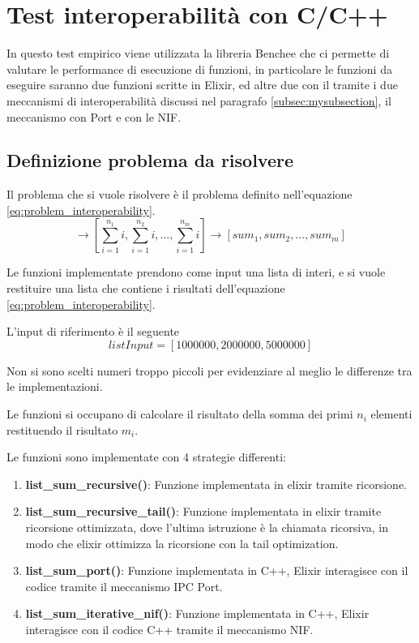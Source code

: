 \newpage

\section{Test interoperabilità con C/C++}

In questo test empirico viene utilizzata la libreria Benchee
che ci permette di valutare le performance di esecuzione di
funzioni, in particolare le funzioni da eseguire saranno due funzioni
scritte in Elixir, ed altre due con il tramite i due meccanismi di
interoperabilità discussi nel paragrafo \ref{subsec:mysubsection},
il meccanismo con Port e con le NIF.

\subsection{Definizione problema da risolvere}
Il problema che si vuole risolvere è il problema definito
nell'equazione \ref{eq:problem_interoperability}.
\begin{equation}
	[n_{1},n{_2}...n{_m}] \rightarrow [\sum_{i=1}^{n_{1}}i,\sum_{i=1}^{n_{2}}i,...,\sum_{i=1}^{n_{m}}i]
  \rightarrow [sum_{1},sum_{2},...,sum_{m}]
  \label{eq:problem_interoperability}
\end{equation}

Le funzioni implementate prendono come input una lista
di interi, e si vuole restituire una lista che contiene
i risultati dell'equazione \ref{eq:problem_interoperability}.

L'input di riferimento è il seguente
\begin{equation}
  listInput = [ 1000000, 2000000, 5000000]
\end{equation}

Non si sono scelti numeri troppo piccoli per
evidenziare al meglio le differenze tra le implementazioni.

Le funzioni si occupano di calcolare il risultato della
somma dei primi $n_{i}$ elementi restituendo il
risultato $m_{i}$.

Le funzioni sono implementate con 4 strategie differenti:
\begin{enumerate}
	\item \textbf{list\_sum\_recursive()}: Funzione implementata in elixir
	tramite ricorsione.
	\item \textbf{list\_sum\_recursive\_tail()}: Funzione implementata in elixir
	tramite ricorsione ottimizzata, dove l'ultima istruzione è la
	chiamata ricorsiva, in modo che elixir ottimizza la ricorsione
	con la tail optimization.
	\item \textbf{list\_sum\_port()}: Funzione implementata in C++, Elixir interagisce
	con il codice tramite il meccanismo IPC Port.
	\item \textbf{list\_sum\_iterative\_nif()}: Funzione implementata in C++, Elixir
	interagisce con il codice C++ tramite il meccanismo NIF.
\end{enumerate}

